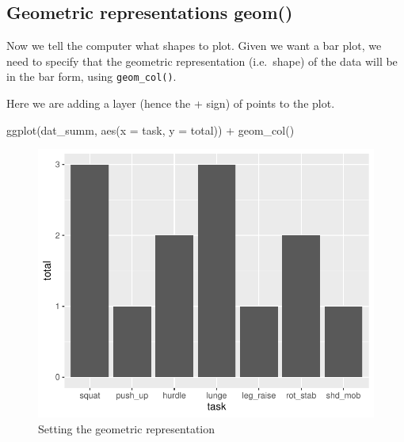 \documentclass[
]{book}
\newenvironment{Shaded}{\begin{snugshade}}{\end{snugshade}}
\newcommand{\AttributeTok}[1]{\textcolor[rgb]{0.77,0.63,0.00}{#1}}
\newcommand{\FunctionTok}[1]{\textcolor[rgb]{0.00,0.00,0.00}{#1}}
\newcommand{\NormalTok}[1]{#1}
\newcommand{\SpecialCharTok}[1]{\textcolor[rgb]{0.00,0.00,0.00}{#1}}
\begin{document}
\hypertarget{BAR-GRAPH-ANATOMY-GEOMS}{%
\subsection{Geometric representations geom()}\label{BAR-GRAPH-ANATOMY-GEOMS}}

Now we tell the computer what shapes to plot. Given we want a bar plot, we need to specify that the geometric representation (i.e.~shape) of the data will be in the bar form, using \texttt{geom\_col()}.

Here we are adding a layer (hence the + sign) of points to the plot.

\begin{Shaded}
\begin{Highlighting}[]
\FunctionTok{ggplot}\NormalTok{(dat\_summ, }\FunctionTok{aes}\NormalTok{(}\AttributeTok{x =}\NormalTok{ task, }\AttributeTok{y =}\NormalTok{ total)) }\SpecialCharTok{+} 
  \FunctionTok{geom\_col}\NormalTok{() }
\end{Highlighting}
\end{Shaded}

\begin{figure}

{\centering \includegraphics{se201_stats_book_files/figure-latex/FIG-BAR-GRAPH-GEOMS-1} 

}

\caption[Setting the geometric representation]{Setting the geometric representation}\label{fig:FIG-BAR-GRAPH-GEOMS}
\end{figure}
\end{document}
